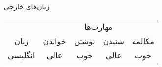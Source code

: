 \documentclass{resume} %
\begin{document}
%	
%
%	
%	
%	
%
\begin{rSection}{زبان‌های خارجی}
	
	\begin{table}[!h]
		\centering
		
		\begin{tabular}{c| c c c c}
			\toprule
			& \multicolumn{4}{c}{مهارت‌ها} \\
			 زبان & خواندن & نوشتن & شنیدن & مکالمه \\
			\midrule
			
			انگلیسی & عالی & خوب & عالی & خوب \\
			
			\bottomrule
		\end{tabular}
	\end{table}
	
\end{rSection}
%
%
%
%
%
%
%
\end{document}
